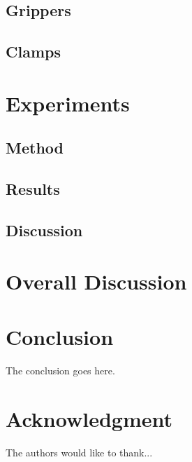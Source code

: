 \documentclass[conference]{IEEEtran}
\begin{document}
\subsection{Grippers}
\subsection{Clamps}

\section{Experiments}
\subsection{Method}
\subsection{Results}
\subsection{Discussion}
\section{Overall Discussion}


\section{Conclusion}
The conclusion goes here.






\section*{Acknowledgment}


The authors would like to thank...






\end{document}
